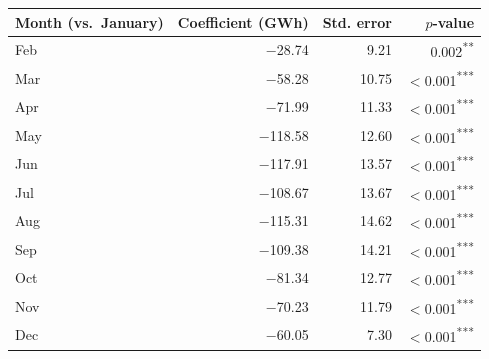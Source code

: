 \begin{tabular}{lrrr}
\toprule
Month (vs.\ January) & Coefficient (GWh) & Std. error & $p$-value \\
\midrule
Feb & $-$28.74 & 9.21 & 0.002\textsuperscript{**\phantom{*}} \\
Mar & $-$58.28 & 10.75 & $<$0.001\textsuperscript{***} \\
Apr & $-$71.99 & 11.33 & $<$0.001\textsuperscript{***} \\
May & $-$118.58 & 12.60 & $<$0.001\textsuperscript{***} \\
Jun & $-$117.91 & 13.57 & $<$0.001\textsuperscript{***} \\
Jul & $-$108.67 & 13.67 & $<$0.001\textsuperscript{***} \\
Aug & $-$115.31 & 14.62 & $<$0.001\textsuperscript{***} \\
Sep & $-$109.38 & 14.21 & $<$0.001\textsuperscript{***} \\
Oct & $-$81.34 & 12.77 & $<$0.001\textsuperscript{***} \\
Nov & $-$70.23 & 11.79 & $<$0.001\textsuperscript{***} \\
Dec & $-$60.05 & 7.30 & $<$0.001\textsuperscript{***} \\
\bottomrule
\end{tabular}
